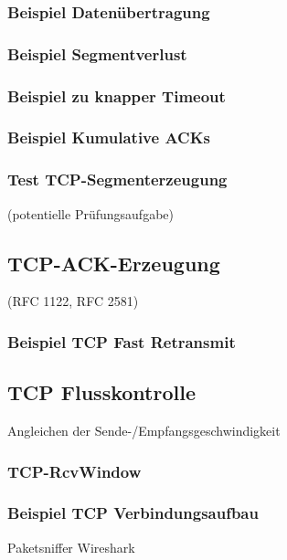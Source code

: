 \subsubsection{Beispiel Datenübertragung}
\subsubsection{Beispiel Segmentverlust}
\subsubsection{Beispiel zu knapper Timeout}
\subsubsection{Beispiel Kumulative ACKs}

\subsubsection{Test TCP-Segmenterzeugung}
(potentielle Prüfungsaufgabe)

\subsection{TCP-ACK-Erzeugung}
(RFC 1122, RFC 2581)
\subsubsection{Beispiel TCP Fast Retransmit}

\subsection{TCP Flusskontrolle}
Angleichen der Sende-/Empfangsgeschwindigkeit
\subsubsection{TCP-RcvWindow}
\subsubsection{Beispiel TCP Verbindungsaufbau}
Paketsniffer Wireshark
